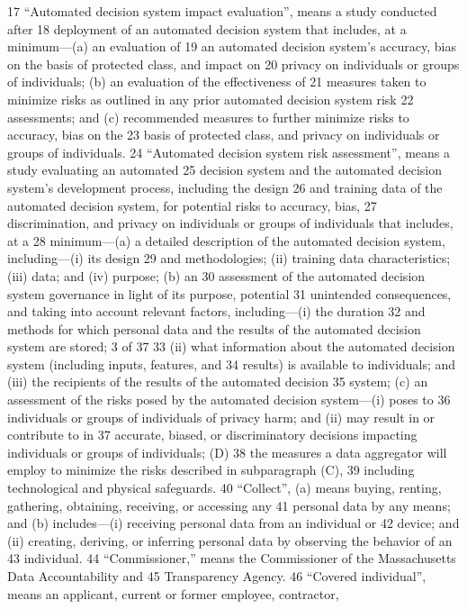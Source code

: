 17 “Automated decision system impact evaluation”, means a study conducted after
18 deployment of an automated decision system that includes, at a minimum—(a) an evaluation of
19 an automated decision system’s accuracy, bias on the basis of protected class, and impact on
20 privacy on individuals or groups of individuals; (b) an evaluation of the effectiveness of
21 measures taken to minimize risks as outlined in any prior automated decision system risk
22 assessments; and (c) recommended measures to further minimize risks to accuracy, bias on the
23 basis of protected class, and privacy on individuals or groups of individuals.
24 “Automated decision system risk assessment”, means a study evaluating an automated
25 decision system and the automated decision system’s development process, including the design
26 and training data of the automated decision system, for potential risks to accuracy, bias,
27 discrimination, and privacy on individuals or groups of individuals that includes, at a
28 minimum—(a) a detailed description of the automated decision system, including—(i) its design
29 and methodologies; (ii) training data characteristics; (iii) data; and (iv) purpose; (b) an
30 assessment of the automated decision system governance in light of its purpose, potential
31 unintended consequences, and taking into account relevant factors, including—(i) the duration
32 and methods for which personal data and the results of the automated decision system are stored;
3 of 37
33 (ii) what information about the automated decision system (including inputs, features, and
34 results) is available to individuals; and (iii) the recipients of the results of the automated decision
35 system; (c) an assessment of the risks posed by the automated decision system—(i) poses to
36 individuals or groups of individuals of privacy harm; and (ii) may result in or contribute to in
37 accurate, biased, or discriminatory decisions impacting individuals or groups of individuals; (D)
38 the measures a data aggregator will employ to minimize the risks described in subparagraph (C),
39 including technological and physical safeguards.
40 “Collect”, (a) means buying, renting, gathering, obtaining, receiving, or accessing any
41 personal data by any means; and (b) includes—(i) receiving personal data from an individual or
42 device; and (ii) creating, deriving, or inferring personal data by observing the behavior of an
43 individual.
44 “Commissioner,” means the Commissioner of the Massachusetts Data Accountability and
45 Transparency Agency.
46 “Covered individual”, means an applicant, current or former employee, contractor,
